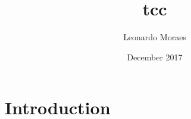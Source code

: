 \documentclass{article}
\title{tcc}
\author{Leonardo Moraes}
\date{December 2017}
\begin{document}
\maketitle

\section{Introduction}
\end{document}
